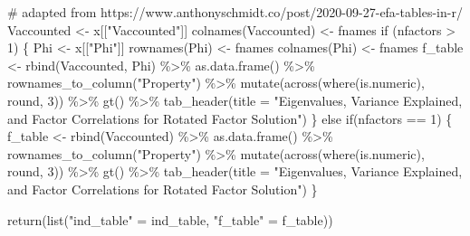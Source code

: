 \documentclass[
  12pt,
]{article}
\newenvironment{Shaded}{\begin{snugshade}}{\end{snugshade}}
\newcommand{\AttributeTok}[1]{\textcolor[rgb]{0.40,0.45,0.13}{#1}}
\newcommand{\CommentTok}[1]{\textcolor[rgb]{0.37,0.37,0.37}{#1}}
\newcommand{\ControlFlowTok}[1]{\textcolor[rgb]{0.00,0.23,0.31}{#1}}
\newcommand{\DecValTok}[1]{\textcolor[rgb]{0.68,0.00,0.00}{#1}}
\newcommand{\FunctionTok}[1]{\textcolor[rgb]{0.28,0.35,0.67}{#1}}
\newcommand{\NormalTok}[1]{\textcolor[rgb]{0.00,0.23,0.31}{#1}}
\newcommand{\OtherTok}[1]{\textcolor[rgb]{0.00,0.23,0.31}{#1}}
\newcommand{\SpecialCharTok}[1]{\textcolor[rgb]{0.37,0.37,0.37}{#1}}
\newcommand{\StringTok}[1]{\textcolor[rgb]{0.13,0.47,0.30}{#1}}
\begin{document}
\begin{Shaded}
\begin{Highlighting}[]
  \CommentTok{\# adapted from https://www.anthonyschmidt.co/post/2020{-}09{-}27{-}efa{-}tables{-}in{-}r/}
\NormalTok{  Vaccounted }\OtherTok{\textless{}{-}}\NormalTok{ x[[}\StringTok{"Vaccounted"}\NormalTok{]]}
  \FunctionTok{colnames}\NormalTok{(Vaccounted) }\OtherTok{\textless{}{-}}\NormalTok{ fnames }
  \ControlFlowTok{if}\NormalTok{ (nfactors }\SpecialCharTok{\textgreater{}} \DecValTok{1}\NormalTok{) \{}
\NormalTok{    Phi }\OtherTok{\textless{}{-}}\NormalTok{ x[[}\StringTok{"Phi"}\NormalTok{]]}
    \FunctionTok{rownames}\NormalTok{(Phi) }\OtherTok{\textless{}{-}}\NormalTok{ fnames}
    \FunctionTok{colnames}\NormalTok{(Phi) }\OtherTok{\textless{}{-}}\NormalTok{ fnames}
\NormalTok{    f\_table }\OtherTok{\textless{}{-}} \FunctionTok{rbind}\NormalTok{(Vaccounted, Phi) }\SpecialCharTok{\%\textgreater{}\%}
      \FunctionTok{as.data.frame}\NormalTok{() }\SpecialCharTok{\%\textgreater{}\%} 
      \FunctionTok{rownames\_to\_column}\NormalTok{(}\StringTok{"Property"}\NormalTok{) }\SpecialCharTok{\%\textgreater{}\%}
      \FunctionTok{mutate}\NormalTok{(}\FunctionTok{across}\NormalTok{(}\FunctionTok{where}\NormalTok{(is.numeric), round, }\DecValTok{3}\NormalTok{)) }\SpecialCharTok{\%\textgreater{}\%}
      \FunctionTok{gt}\NormalTok{() }\SpecialCharTok{\%\textgreater{}\%} \FunctionTok{tab\_header}\NormalTok{(}\AttributeTok{title =} \StringTok{"Eigenvalues, Variance Explained, and Factor Correlations for Rotated Factor Solution"}\NormalTok{)}
\NormalTok{  \}}
  \ControlFlowTok{else} \ControlFlowTok{if}\NormalTok{(nfactors }\SpecialCharTok{==} \DecValTok{1}\NormalTok{) \{}
\NormalTok{    f\_table }\OtherTok{\textless{}{-}} \FunctionTok{rbind}\NormalTok{(Vaccounted) }\SpecialCharTok{\%\textgreater{}\%}
      \FunctionTok{as.data.frame}\NormalTok{() }\SpecialCharTok{\%\textgreater{}\%} 
      \FunctionTok{rownames\_to\_column}\NormalTok{(}\StringTok{"Property"}\NormalTok{) }\SpecialCharTok{\%\textgreater{}\%}
      \FunctionTok{mutate}\NormalTok{(}\FunctionTok{across}\NormalTok{(}\FunctionTok{where}\NormalTok{(is.numeric), round, }\DecValTok{3}\NormalTok{)) }\SpecialCharTok{\%\textgreater{}\%}
      \FunctionTok{gt}\NormalTok{() }\SpecialCharTok{\%\textgreater{}\%} \FunctionTok{tab\_header}\NormalTok{(}\AttributeTok{title =} \StringTok{"Eigenvalues, Variance Explained, and Factor Correlations for Rotated Factor Solution"}\NormalTok{)}
\NormalTok{  \}}
  
  \FunctionTok{return}\NormalTok{(}\FunctionTok{list}\NormalTok{(}\StringTok{"ind\_table"} \OtherTok{=}\NormalTok{ ind\_table, }\StringTok{"f\_table"} \OtherTok{=}\NormalTok{ f\_table))}
  

\end{Highlighting}
\end{Shaded}
\end{document}
